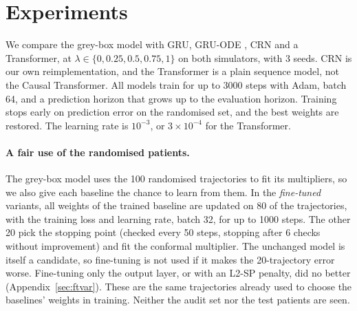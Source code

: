 \documentclass[letterpaper]{article}
\begin{document}
\section{Experiments}

We compare the grey-box model with GRU, GRU-ODE \citep{debrouwer2019gruode}, CRN \citep{bica2020crn} and a Transformer, at $\lambda\in\{0,0.25,0.5,0.75,1\}$ on both simulators, with 3 seeds. CRN is our own reimplementation, and the Transformer is a plain sequence model, not the Causal Transformer. All models train for up to 3000 steps with Adam, batch 64, and a prediction horizon that grows up to the evaluation horizon. Training stops early on prediction error on the randomised set, and the best weights are restored. The learning rate is $10^{-3}$, or $3\times10^{-4}$ for the Transformer.

\paragraph{A fair use of the randomised patients.} The grey-box model uses the 100 randomised trajectories to fit its multipliers, so we also give each baseline the chance to learn from them. In the \emph{fine-tuned} variants, all weights of the trained baseline are updated on 80 of the trajectories, with the training loss and learning rate, batch 32, for up to 1000 steps. The other 20 pick the stopping point (checked every 50 steps, stopping after 6 checks without improvement) and fit the conformal multiplier. The unchanged model is itself a candidate, so fine-tuning is not used if it makes the 20-trajectory error worse. Fine-tuning only the output layer, or with an L2-SP penalty, did no better (Appendix~\ref{sec:ftvar}). These are the same trajectories already used to choose the baselines' weights in training. Neither the audit set nor the test patients are seen.
\end{document}
